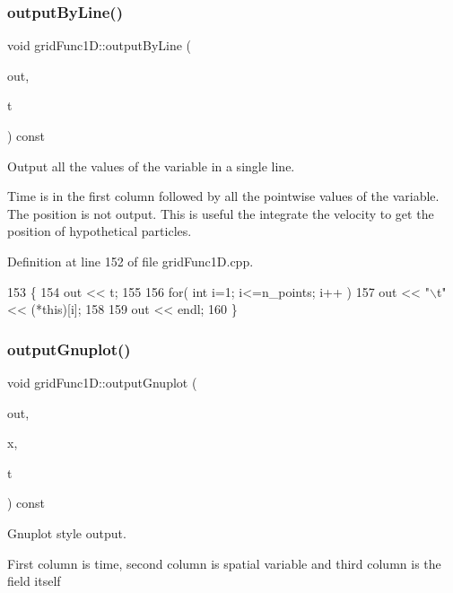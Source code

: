 \subsubsection{\texorpdfstring{output\+By\+Line()}{outputByLine()}}
{\footnotesize\ttfamily void grid\+Func1\+D\+::output\+By\+Line (\begin{DoxyParamCaption}\item[{ofstream \&}]{out,  }\item[{const double}]{t }\end{DoxyParamCaption}) const}



Output all the values of the variable in a single line. 

Time is in the first column followed by all the pointwise values of the variable. The position is not output. This is useful the integrate the velocity to get the position of hypothetical particles. 

Definition at line 152 of file grid\+Func1\+D.\+cpp.


\begin{DoxyCode}
153 \{
154   out << t;
155 
156   \textcolor{keywordflow}{for}( \textcolor{keywordtype}{int} i=1; i<=n\_points; i++ )
157     out << \textcolor{stringliteral}{"\(\backslash\)t"} << (*\textcolor{keyword}{this})[i];
158 
159   out << endl;
160 \}
\end{DoxyCode}
\mbox{\label{classgridFunc1D_aeb63f2e7e15429025c33aa24abf288ad}} 
\subsubsection{\texorpdfstring{output\+Gnuplot()}{outputGnuplot()}}
{\footnotesize\ttfamily void grid\+Func1\+D\+::output\+Gnuplot (\begin{DoxyParamCaption}\item[{ofstream \&}]{out,  }\item[{\hyperlink{classgridFunc1D}{grid\+Func1D} \&}]{x,  }\item[{const double}]{t }\end{DoxyParamCaption}) const}



Gnuplot style output. 

First column is time, second column is spatial variable and third column is the field itself 

